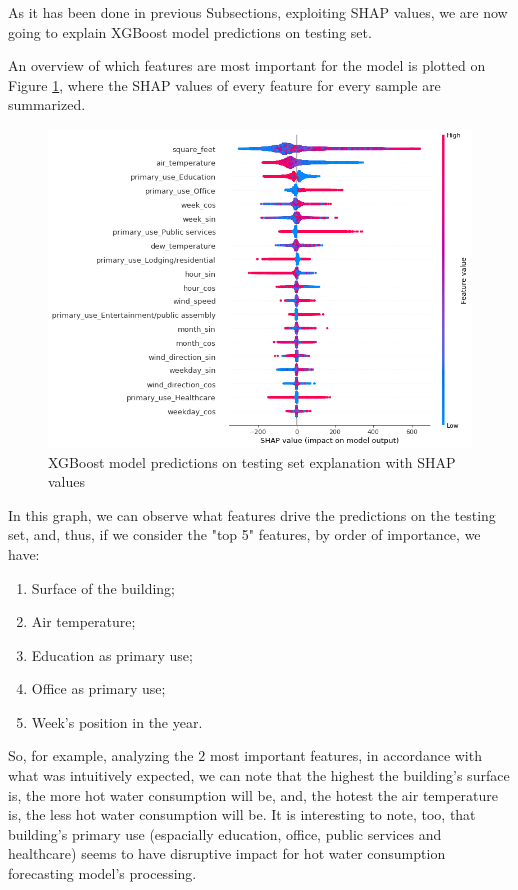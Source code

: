 \documentclass[twocolumn, switch]{article}
\begin{document}
As it has been done in previous Subsections, exploiting SHAP values, we are now going to explain XGBoost model predictions on testing set.

An overview of which features are most important for the model is plotted on Figure \ref{fig:shap_values_summary_plot_hot_water}, where the SHAP values of every feature for every sample are summarized.

\begin{figure}[H]
\centering
\includegraphics[scale=0.3]{../graphs/shap_values_summary_plot_hot_water}
\caption{XGBoost model predictions on testing set explanation with SHAP values}
\label{fig:shap_values_summary_plot_hot_water}
\end{figure}

In this graph, we can observe what features drive the predictions on the testing set, and, thus, if we consider the "top 5" features, by order of importance, we have:

\begin{enumerate}
\item Surface of the building;
\item Air temperature;
\item Education as primary use;
\item Office as primary use;
\item Week's position in the year.
\end{enumerate}

So, for example, analyzing the $2$ most important features, in accordance with what was intuitively expected, we can note that the highest the building's surface is, the more hot water consumption will be, and, the hotest the air temperature is, the less hot water consumption will be. It is interesting to note, too, that building's primary use (espacially education, office, public services and healthcare) seems to have disruptive impact for hot water consumption forecasting model's processing.
\end{document}

